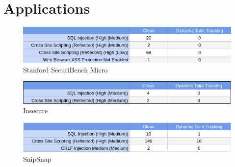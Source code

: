 \section{Applications}
\begin{figure}[!h]
	\centering
	\includegraphics[width=\textwidth]{images/Micro.png}
	\caption{Stanford SecuriBench Micro}
	\label{fig:Micro}
\end{figure}

\begin{figure}[!h]
	\centering
	\includegraphics[width=\textwidth]{images/Insecure.png}
	\caption{Insecure}
	\label{fig:Insecure}
\end{figure}

\begin{figure}[!h]
	\centering
	\includegraphics[width=\textwidth]{images/SnipSnap.png}
	\caption{SnipSnap}
	\label{fig:SnipSnap}
\end{figure}
